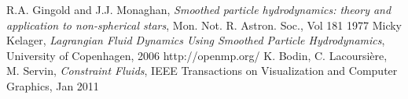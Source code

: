 \documentclass[a4paper,12pt,oneside,final]{extarticle}
\begin{document}


\begin{thebibliography}{9}
  
  R.A. Gingold and J.J. Monaghan, \emph{Smoothed particle hydrodynamics: theory and application to non-spherical stars}, Mon. Not. R. Astron. Soc., Vol 181 1977
  Micky Kelager, \emph{Lagrangian Fluid Dynamics Using Smoothed Particle Hydrodynamics}, University of Copenhagen, 2006
  http://openmp.org/
   K. Bodin, C. Lacoursière, M. Servin, \emph{Constraint Fluids}, IEEE Transactions on Visualization and Computer Graphics, Jan 2011 
\end{thebibliography}
\end{document}
